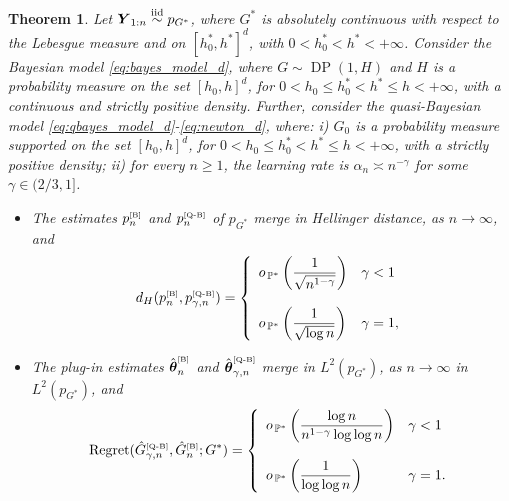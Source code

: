 \documentclass[twoside,12pt]{article}
\def\simiid{\stackrel{\mbox{\scriptsize{iid}}}{\sim}}
\newtheorem{thm}{Theorem}[section]
\begin{document}
\begin{thm}\label{merge_d}
Let $\boldsymbol Y_{1:n}\simiid p_{G^\ast}$, where $G^\ast$ is absolutely continuous with respect to the Lebesgue measure and on $[h_0^\ast,h^\ast]^d$, with  $0<h_0^\ast<h^\ast<+\infty$. Consider the Bayesian model \eqref{eq:bayes_model_d}, where  $G\sim\operatorname{DP}(1,H)$ and $H$ is a probability measure on the set $[h_{0},h]^d$, for $0<h_{0}\leq h_{0}^{\ast}<h^{\ast}\leq h<+\infty$, with a continuous and strictly positive density. Further, consider the quasi-Bayesian model \eqref{eq:qbayes_model_d}-\eqref{eq:newton_d}, where: i)  $G_0$ is a probability measure supported on the set $[h_0,h]^d$, for  $0<h_0\leq h_0^\ast< h^\ast\leq h<+\infty$, with a strictly positive density; ii) for every $n\geq1$, the learning rate is $\alpha_n\asymp n^{-\gamma}$ for some $\gamma\in (2/3,1]$. 
\begin{itemize}
    \item[a)] The estimates  $p_{n}^{\text{\tiny{[B]}}}$ and $p_{n}^{\text{\tiny{[Q-B]}}}$ of $p_{G^\ast}$ merge in Hellinger distance, as $n\rightarrow\infty$, and
    \begin{displaymath}
d_H(p_{n}^{\text{\tiny{[B]}}},p_{\gamma,n}^{\text{\tiny{[Q-B]}}})=\left\{
\begin{array}{ll}
o_{\,\mathbb{P}^{\ast}}\left(\dfrac {1}{\sqrt{n^{1-\gamma}}}\right)&\gamma<1\\
\\
o_{\,\mathbb{P}^{\ast}}\left(\dfrac{1}{\sqrt{\log n}}\right)&\gamma=1,
\end{array}\right.
\end{displaymath}
\item[b)] The plug-in estimates $\hat{\boldsymbol \theta}_{n}^{\text{\tiny{[B]}}}$ and $\hat{\boldsymbol\theta}_{\gamma,n}^{\text{\tiny{[Q-B]}}}$ merge in $L^2(p_{G^*})$, as $n\rightarrow\infty$ in $L^2(p_{G^*})$, and
\begin{displaymath}
\mathrm{Regret}(\hat G_{\gamma,n}^{\text{\tiny{[Q-B]}}},\hat G_{n}^{\text{\tiny{[B]}}};G^{\ast})
=
\left\{
\begin{array}{ll}
o_{\,\mathbb{P}^{\ast}}\left(\dfrac{\log n}{n^{1-\gamma}\log\log n}\right)&\gamma <1\\
\\
o_{\,\mathbb{P}^{\ast}}\left(\dfrac{1}{\log\log n}\right)&\gamma =1.
\end{array}
\right.
\end{displaymath}
\end{itemize}
\end{thm}
\end{document}
